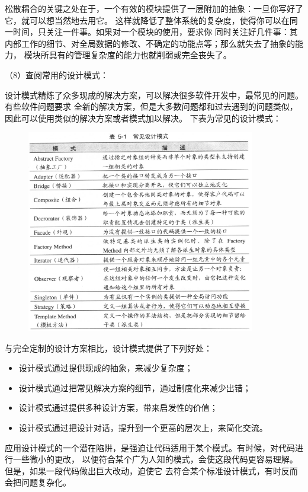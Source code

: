 \documentclass{article}
\begin{document}
\par
松散耦合的关键之处在于，一个有效的模块提供了一层附加的抽象：一旦你写好了它，就可以想当然地去用它。
这样就降低了整体系统的复杂度，使得你可以在同一时间，只关注一件事。如果对一个模块的使用，要求你
同时关注好几件事：其内部工作的细节、对全局数据的修改、不确定的功能点等；那么就失去了抽象的能力，
模块所具有的管理复杂度的能力也就削弱或完全丧失了。

\par
（8）查阅常用的设计模式：
\par
设计模式精炼了众多现成的解决方案，可以解决很多软件开发中，最常见的问题。有些软件问题要求
全新的解决方案，但是大多数问题都和过去遇到的问题类似，因此可以使用类似的解决方案或者模式加以解决。
下表为常见的设计模式：
\begin{figure}[ht]
    \centering
    \includegraphics[width=10cm]{figure9.png}
\end{figure}
\par
与完全定制的设计方案相比，设计模式提供了下列好处：
\begin{itemize}
    \item 设计模式通过提供现成的抽象，来减少复杂度；
    \item 设计模式通过把常见解决方案的细节，通过制度化来减少出错；
    \item 设计模式通过提供多种设计方案，带来启发性的价值；
    \item 设计模式通过把设计对话，提升到一个更高的层次上，来简化交流。
\end{itemize}
\par
应用设计模式的一个潜在陷阱，是强迫让代码适用于某个模式。有时候，对代码进行一些微小的更改，
以便符合某个广为人知的模式，会使这段代码更容易理解。但是，如果一段代码做出巨大改动，迫使它
去符合某个标准设计模式，有时反而会把问题复杂化。
\end{document}

